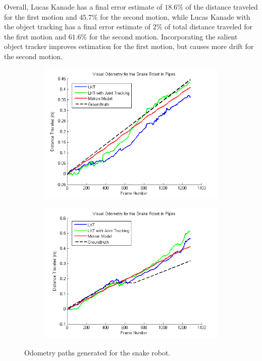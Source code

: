 \documentclass[letterpaper, 10 pt, conference]{ieeeconf}
\begin{document}
Overall, Lucas Kanade has a final error estimate of $18.6 \%$ of the distance traveled for the first motion and $45.7 \%$ for the second motion, while Lucas Kanade with the object tracking has a final error estimate of $2 \%$ of total distance traveled for the first motion and $61.6 \%$ for the second motion. Incorporating the salient object tracker improves estimation for the first motion, but causes more drift for the second motion.

\begin{figure}[tb]
	\centering
	\begin{subfigure}{\columnwidth}
		  \centering
		  \includegraphics[width=\columnwidth]{trial8_path.png}
		  \label{snakes:trial8_path}
	\end{subfigure}
	\begin{subfigure}{\columnwidth}
		  \centering
		  \includegraphics[width=\columnwidth]{trial9_path.png}
		  \label{snakes:trial9_path}
	\end{subfigure}
	\caption{Odometry paths generated for the snake robot.}
    \label{snakes_path}
\end{figure}
\end{document}
